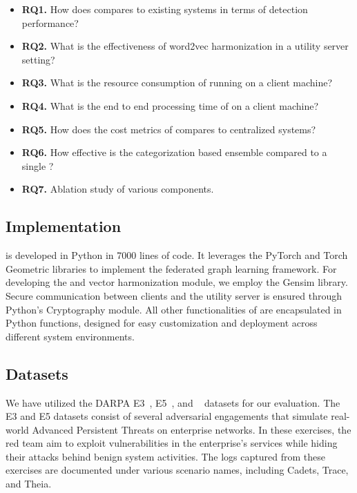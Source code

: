 \begin{itemize}[leftmargin=*]
\item \textbf{RQ1.} How does \Sys compares to existing systems in terms of detection performance?
\item \textbf{RQ2.} What is the effectiveness of word2vec harmonization in a utility server setting?
\item \textbf{RQ3.} What is the resource consumption of \Sys running on a client machine?
\item \textbf{RQ4.} What is the end to end processing time of \Sys on a client machine?
\item \textbf{RQ5.} How does the cost metrics of \Sys compares to centralized systems?
\item \textbf{RQ6.} How effective is the categorization based \gnnshort ensemble compared to a single \gnnshort?
\item \textbf{RQ7.} Ablation study of various \Sys components.
\end{itemize}

\subsection{Implementation}

\Sys is developed in Python in 7000 lines of code. It leverages the PyTorch and Torch Geometric libraries to implement the federated graph learning framework. For developing the \wordvec and vector harmonization module, we employ the Gensim library. Secure communication between clients and the utility server is ensured through Python's Cryptography module. All other functionalities of \Sys are encapsulated in Python functions, designed for easy customization and deployment across different system environments.


\subsection{Datasets}
We have utilized the DARPA E3~\cite{darpae3}, E5~\cite{darpae5}, and \optc~\cite{darpaoptc} datasets for our evaluation. The E3 and E5 datasets consist of several adversarial engagements that simulate real-world Advanced Persistent Threats on enterprise networks. In these exercises, the red team aim to exploit vulnerabilities in the enterprise's services while hiding their attacks behind benign system activities. The logs captured from these exercises are documented under various scenario names, including Cadets, Trace, and Theia.

